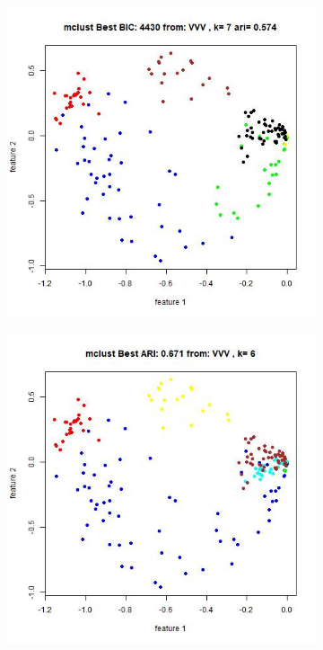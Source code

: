 \documentclass{article}
\begin{document}
\begin{figure}[h!]
\centering
\begin{subfigure}[b]{0.4\linewidth}
  \includegraphics[width=\linewidth]{r_bic_allk.jpg}
\end{subfigure}
\begin{subfigure}[b]{0.4\linewidth}
  \includegraphics[width=\linewidth]{r_ari_allk.jpg}


\end{subfigure}
\end{figure}
\end{document}
